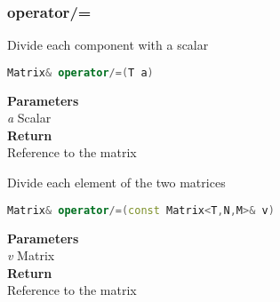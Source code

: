 \subsubsection{operator/=}
\begin{mdframed}
Divide each component with a scalar
\begin{lstlisting}[language=C++]
Matrix& operator/=(T a)
\end{lstlisting}
\textbf{Parameters} \\ 
\textit{a} Scalar \\ 
\textbf{Return} \\ 
Reference to the matrix\\ 
\end{mdframed}

\begin{mdframed}
Divide each element of the two matrices
\begin{lstlisting}[language=C++]
Matrix& operator/=(const Matrix<T,N,M>& v)
\end{lstlisting}
\textbf{Parameters} \\ 
\textit{v} Matrix \\ 
\textbf{Return} \\ 
Reference to the matrix\\ 
\end{mdframed}

